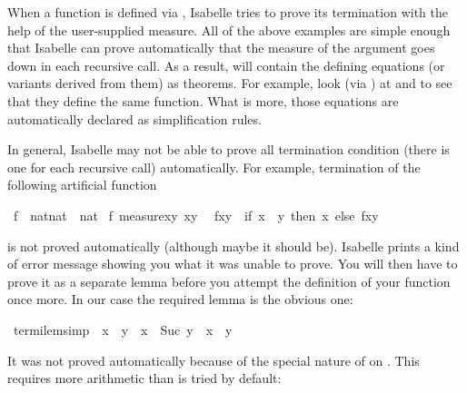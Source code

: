 \begin{isabelle}%
%
\begin{isamarkuptext}%
When a function is defined via , Isabelle tries to prove
its termination with the help of the user-supplied measure.  All of the above
examples are simple enough that Isabelle can prove automatically that the
measure of the argument goes down in each recursive call. As a result,
 will contain the defining equations (or variants derived from
them) as theorems. For example, look (via ) at
 and  to see that they define the same
function. What is more, those equations are automatically declared as
simplification rules.

In general, Isabelle may not be able to prove all termination condition
(there is one for each recursive call) automatically. For example,
termination of the following artificial function%
\end{isamarkuptext}%
\ f\ {\isacharcolon}{\isacharcolon}\ {\isachardoublequote}nat{\isacharasterisk}nat\ {\isasymRightarrow}\ nat{\isachardoublequote}\isanewline
{}\ f\ {\isachardoublequote}measure{\isacharparenleft}{\isasymlambda}{\isacharparenleft}x{\isacharcomma}y{\isacharparenright}{\isachardot}\ x{\isacharminus}y{\isacharparenright}{\isachardoublequote}\isanewline
\ \ {\isachardoublequote}f{\isacharparenleft}x{\isacharcomma}y{\isacharparenright}\ {\isacharequal}\ {\isacharparenleft}if\ x\ {\isasymle}\ y\ then\ x\ else\ f{\isacharparenleft}x{\isacharcomma}y{\isacharplus}%
\begin{isamarkuptext}%
\noindent
is not proved automatically (although maybe it should be). Isabelle prints a
kind of error message showing you what it was unable to prove. You will then
have to prove it as a separate lemma before you attempt the definition
of your function once more. In our case the required lemma is the obvious one:%
\end{isamarkuptext}%
\ termi{\isacharunderscore}lem{\isacharbrackleft}simp{\isacharbrackright}{\isacharcolon}\ {\isachardoublequote}{\isasymnot}\ x\ {\isasymle}\ y\ {\isasymLongrightarrow}\ x\ {\isacharminus}\ Suc\ y\ {\isacharless}\ x\ {\isacharminus}\ y{\isachardoublequote}%
\begin{isamarkuptxt}%
\noindent
It was not proved automatically because of the special nature of \isa{-}
on . This requires more arithmetic than is tried by default:%

\end{isamarkuptxt}
\end{isabelle}
